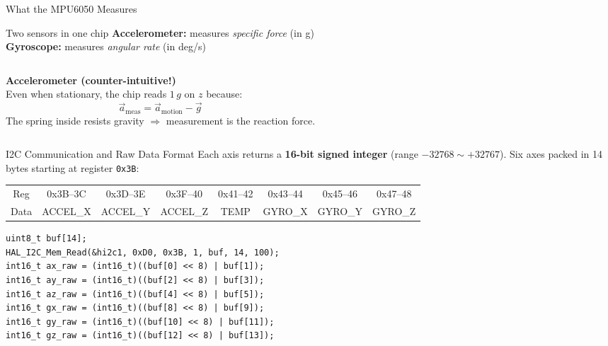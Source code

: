 \documentclass[10pt]{beamer}
\begin{document}
\begin{frame}{What the MPU6050 Measures}
  \begin{block}{Two sensors in one chip}
    \textbf{Accelerometer:} measures \emph{specific force} (in g)\\
    \textbf{Gyroscope:} measures \emph{angular rate} (in deg/s)
  \end{block}

  \begin{columns}[T,onlytextwidth]
    \textbf{Accelerometer (counter-intuitive!)}\\
    Even when stationary, the chip reads $1\,g$ on $z$ because:
    \[
      \vec{a}_{\text{meas}} = \vec{a}_{\text{motion}} - \vec{g}
    \]
    The spring inside resists gravity $\Rightarrow$ measurement is the reaction force.

    \begin{center}
    \end{center}
  \end{columns}
\end{frame}

\begin{frame}[fragile]{I2C Communication and Raw Data Format}
  Each axis returns a \textbf{16-bit signed integer} (range $-32768 \sim +32767$).
  Six axes packed in 14 bytes starting at register \texttt{0x3B}:

  \begin{center}
  \scriptsize
  \begin{tabular}{cccccccc}
    \toprule
    Reg & 0x3B--3C & 0x3D--3E & 0x3F--40 & 0x41--42 & 0x43--44 & 0x45--46 & 0x47--48 \\
    Data & ACCEL\_X & ACCEL\_Y & ACCEL\_Z & TEMP & GYRO\_X & GYRO\_Y & GYRO\_Z \\
    \bottomrule
  \end{tabular}
  \end{center}

\begin{lstlisting}
uint8_t buf[14];
HAL_I2C_Mem_Read(&hi2c1, 0xD0, 0x3B, 1, buf, 14, 100);
int16_t ax_raw = (int16_t)((buf[0] << 8) | buf[1]);
int16_t ay_raw = (int16_t)((buf[2] << 8) | buf[3]);
int16_t az_raw = (int16_t)((buf[4] << 8) | buf[5]);
int16_t gx_raw = (int16_t)((buf[8] << 8) | buf[9]);
int16_t gy_raw = (int16_t)((buf[10] << 8) | buf[11]);
int16_t gz_raw = (int16_t)((buf[12] << 8) | buf[13]);
\end{lstlisting}
\end{frame}
\end{document}
